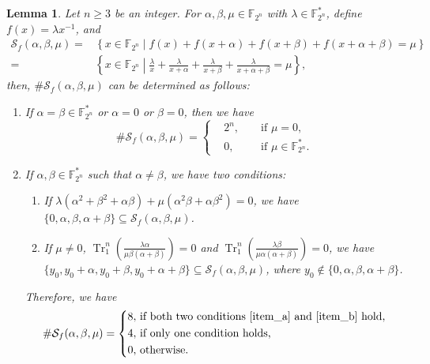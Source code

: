 \documentclass{article}
\newcommand{\F}{\mathbb{F}}
\newcommand{\0}{\textbf{0}}
\newcommand{\1}{\textbf{1}}
\newcommand{\TrN}{\operatorname{Tr}_1^n}
\theoremstyle{plain}
\newtheorem{lemma}{Lemma}
\begin{document}
    \begin{lemma}\label{lemma:num_sol_second_dev}
        Let $n\ge 3$ be an integer.
        For $\alpha,\beta,\mu\in\F_{2^n}$ with $\lambda\in\F_{2^n}^*$, define $f(x)=\lambda x^{-1}$, and
        \begin{align*}
            \mathcal{S}_f(\alpha,\beta,\mu)=&\left\{x\in\F_{2^n}\middle|f(x)+f(x+\alpha)+f(x+\beta)+f(x+\alpha+\beta)=\mu\right\}\\
            =&\left\{ x\in\F_{2^n}\middle|\frac{\lambda}{x}+\frac{\lambda}{x+\alpha}+\frac{\lambda}{x+\beta}+\frac{\lambda}{x+\alpha+\beta}=\mu \right\},
        \end{align*}
        then, $\#\mathcal{S}_f(\alpha,\beta,\mu)$ can be determined as follows:
        \begin{enumerate}[label=(\arabic{*})]
            \item If $\alpha=\beta\in\F_{2^n}^*$ or $\alpha=0$ or $\beta=0$, then we have
            \[\#\mathcal{S}_f(\alpha,\beta,\mu) = \left\{
                \begin{alignedat}{2}
                    &2^n,&&\text{ if }\mu = 0,\\
                    &0,  &&\text{ if }\mu\in\F_{2^n}^*.
                \end{alignedat}\right.\]
            \item If $\alpha,\beta\in\F_{2^n}^*$ such that $\alpha\ne\beta$, we have two conditions:
            \begin{enumerate}[ref=(\alph{*})]
                \item If $\lambda(\alpha^2+\beta^2+\alpha\beta)+\mu(\alpha^2\beta+\alpha\beta^2)=0$, we have
                $\{0,\alpha,\beta,\alpha+\beta\}\subseteq\mathcal{S}_f(\alpha,\beta,\mu)$.\label{item_a}
                \item If $\mu\ne 0$, $\TrN\left(\frac{\lambda\alpha}{\mu \beta(\alpha+\beta)}\right)=0$ and
                $\TrN\left(\frac{\lambda \beta}{\mu \alpha(\alpha+\beta)}\right)=0$, we have
                $\{y_0,y_0+\alpha,y_0+\beta,y_0+\alpha+\beta\}\subseteq\mathcal{S}_f(\alpha,\beta,\mu)$, where $y_0\notin\{0,\alpha,\beta,\alpha+\beta\}$.\label{item_b}
            \end{enumerate}
            Therefore, we have
            \[\#\mathcal{S}_f(\alpha,\beta,\mu) = \left\{
                \begin{alignedat}{2}
                    &8,&&\text{ if both two conditions }\ref{item_a}\text{ and }\ref{item_b}\text{ hold,}\\
                    &4,&&\text{ if only one condition holds,}\\
                    &0,&&\text{ otherwise.}
                \end{alignedat}\right.\]
        \end{enumerate}
    \end{lemma}
\end{document}
